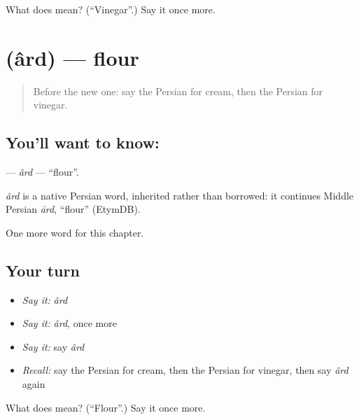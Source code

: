 \begin{tcolorbox}[breakable,colback=teal!4,colframe=teal!35!black,title={Before you move on}]
What does  mean? (\textquotedblleft{}Vinegar\textquotedblright{}.) Say it once more.
\end{tcolorbox}
\section[\texorpdfstring{\fa{آرد} (ârd)}{آرد (ârd)}]{ (ârd) — flour}

\label{lesson:FA-C276-ard}



\begin{quote}
Before the new one: say the Persian for cream, then the Persian for vinegar.
\end{quote}

\subsection*{You'll want to know: }
\textbf{} — \emph{ârd} — \textquotedblleft{}flour\textquotedblright{}.

\begin{cousinweb}
\emph{ârd} is a native Persian word, inherited rather than borrowed: it continues Middle Persian \emph{ārd}, \textquotedblleft{}flour\textquotedblright{} (EtymDB).
\end{cousinweb}

\begin{grammarlens}[title={What you've built}]
One more word for this chapter.
\end{grammarlens}

\subsection*{Your turn}
\begin{itemize}
\raggedright
  \item \emph{Say it:} \emph{ârd}
  \item \emph{Say it:} \emph{ârd}, once more
  \item \emph{Say it:} say \emph{ârd}
  \item \emph{Recall:} say the Persian for cream, then the Persian for vinegar, then say \emph{ârd} again
\end{itemize}

\begin{tcolorbox}[breakable,colback=teal!4,colframe=teal!35!black,title={Before you move on}]
What does  mean? (\textquotedblleft{}Flour\textquotedblright{}.) Say it once more.
\end{tcolorbox}
